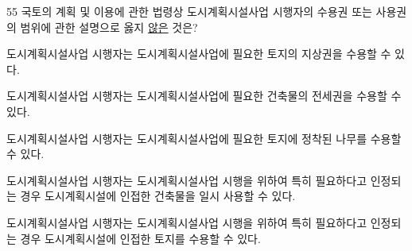 \begin{question}{55}
국토의 계획 및 이용에 관한 법령상 도시계획시설사업 시행자의 수용권 또는 사용권의 범위에 관한 설명으로 옳지 \uline{않은} 것은?
\begin{choices}
  \item 도시계획시설사업 시행자는 도시계획시설사업에 필요한 토지의 지상권을 수용할 수 있다.
  \item 도시계획시설사업 시행자는 도시계획시설사업에 필요한 건축물의 전세권을 수용할 수 있다.
  \item 도시계획시설사업 시행자는 도시계획시설사업에 필요한 토지에 정착된 나무를 수용할 수 있다.
  \item 도시계획시설사업 시행자는 도시계획시설사업 시행을 위하여 특히 필요하다고 인정되는 경우 도시계획시설에 인접한 건축물을 일시 사용할 수 있다.
  \item 도시계획시설사업 시행자는 도시계획시설사업 시행을 위하여 특히 필요하다고 인정되는 경우 도시계획시설에 인접한 토지를 수용할 수 있다.
\end{choices}
\end{question}
